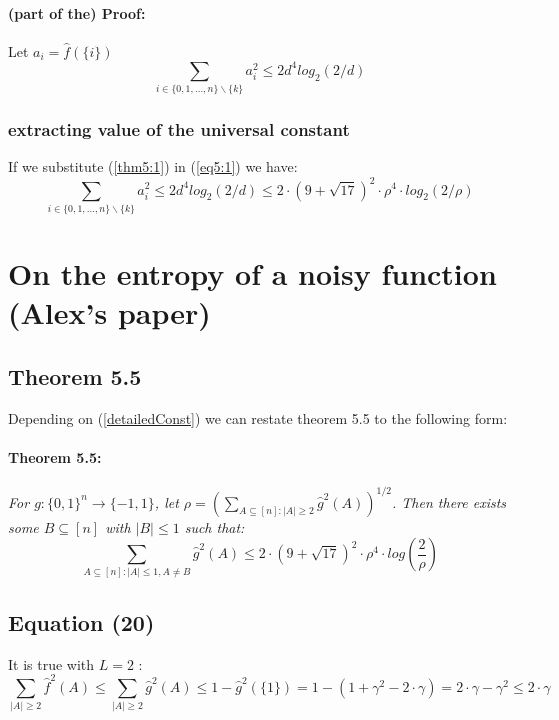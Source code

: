 \documentclass{article}
\begin{document}
				\paragraph{(part of the) Proof:}
					Let $a_i = \hat{f}(\{i\})$
					\begin{equation} \label{eq5:1}
						\sum_{i \in \{0,1, \dots , n\} \backslash \{k\}} a_i^2 \leq 2d^4log_2(2/d)
					\end{equation}		
			\subsubsection{extracting value of the universal constant}
				If we substitute (\ref{thm5:1}) in (\ref{eq5:1}) we have:
				\begin{equation} \label{detailedConst}
					\sum_{i \in \{0,1, \dots , n\} \backslash \{k\}} a_i^2 
					\leq 2d^4log_2(2/d) 
					\leq 2 \cdot \left( 9 + \sqrt{17} \right) ^ 2 \cdot \rho^4 \cdot log_2(2/\rho)
				\end{equation}
	
	
	\section{On the entropy of a noisy function (Alex's paper)}
		\subsection{Theorem 5.5}
			Depending on (\ref{detailedConst}) we can restate theorem 5.5 to the following form:
			\paragraph{Theorem 5.5:} \textit{For $ g: \{0,1\}^n \rightarrow \{-1,1\}$, let $\rho = \left( \sum_{A \subseteq [n]: |A| \geq 2} \hat{g}^2(A) \right) ^ {1/2} $. Then there exists some $ B \subseteq [n]$ with $|B| \leq 1$ such that:}
				$$  \sum_{A \subseteq [n]: |A| \leq 1, A \neq B} \hat{g}^2 (A) \leq 2 \cdot \left( 9 + \sqrt{17} \right)^2 \cdot \rho^4 \cdot log \left( \frac{2}{\rho} \right) $$
	
		\subsection{Equation (20)}
			It is true with $L=2$ :
			\begin{equation} \label{eq:20}
				\sum_{|A| \geq 2} \hat{f}^2 (A) 
				\leq \sum_{|A| \geq 2} \hat{g}^2 (A) 
				\leq 1 - \hat{g}^2(\{1\}) = 1 - \left( 1 + \gamma^2 - 2 \cdot \gamma \right) = 2 \cdot \gamma - \gamma^2 
				\leq 2 \cdot \gamma
			\end{equation}
	
\end{document}

